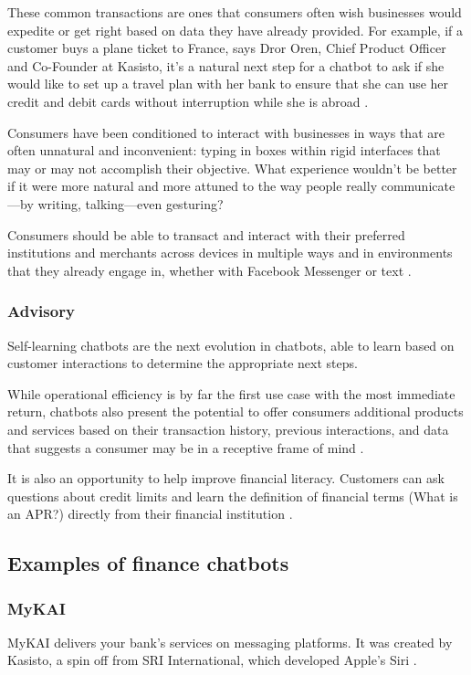 These common transactions are ones that consumers often wish businesses would expedite or get right based on data they have already provided. For example, if a customer buys a plane ticket to France, says Dror Oren, Chief Product Officer and Co-Founder at Kasisto, it’s a natural next step for a chatbot to ask if she would like to set up a travel plan with her bank to ensure that she can use her credit and debit cards without interruption while she is abroad \cite{etlinger2017}.

Consumers have been conditioned to interact with businesses in ways that are often unnatural and inconvenient: typing in boxes within rigid interfaces that may or may not accomplish their objective. What experience wouldn’t be better if it were more natural and more attuned to the way people really communicate—by writing, talking—even gesturing?

Consumers should be able to transact and interact with their preferred institutions and merchants across devices in multiple ways and in environments that they already engage in, whether with Facebook Messenger or text \cite{etlinger2017}.

\subsubsection{Advisory}
Self-learning chatbots are the next evolution in chatbots, able to learn based on customer interactions to determine the appropriate next steps.

While operational efficiency is by far the first use case with the most immediate return, chatbots also present the potential to offer consumers additional products and services based on their transaction history, previous interactions, and data that suggests a consumer may be in a receptive frame of mind \cite{etlinger2017}.

It is also an opportunity to help improve financial literacy. Customers can ask questions about credit limits and learn the definition of financial terms (What is an APR?) directly from their financial institution \cite{etlinger2017}.

\subsection{Examples of finance chatbots}

\subsubsection{MyKAI}
MyKAI delivers your bank’s services on messaging platforms. It was created by Kasisto, a spin off from SRI International, which developed Apple’s Siri \cite{kasisto}.

